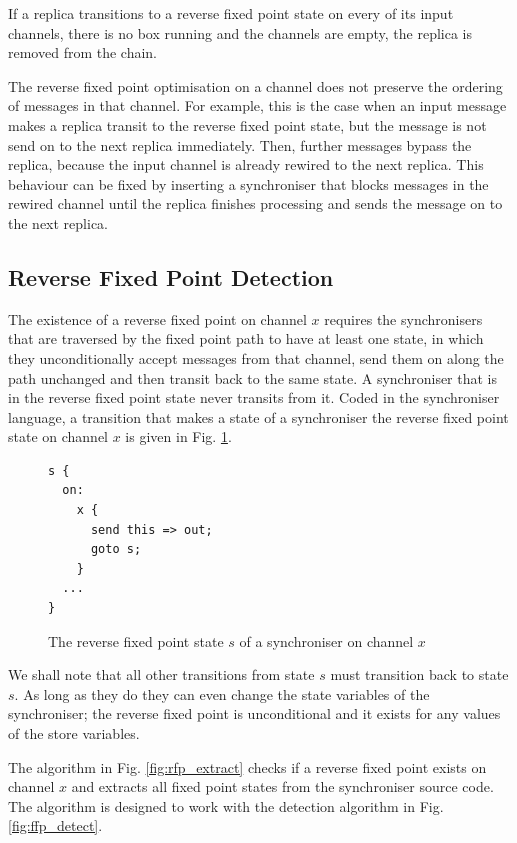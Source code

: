 If a replica transitions to a reverse fixed point state on every of its input channels, there is no box running and the channels are empty, the replica is removed from the chain.

The reverse fixed point optimisation on a channel does not preserve the ordering of messages in that channel. For example, this is the case when an input message makes a replica transit to the reverse fixed point state, but the message is not send on to the next replica immediately. Then, further messages bypass the replica, because the input channel is already rewired to the next replica. This behaviour can be fixed by inserting a synchroniser that blocks messages in the rewired channel until the replica finishes processing and sends the message on to the next replica.


    \subsection{Reverse Fixed Point Detection\label{rfp_detect}}
The existence of a reverse fixed point on channel $x$ requires the synchronisers that are traversed by the fixed point path to have at least one state, in which they unconditionally accept messages from that channel, send them on along the path unchanged and then transit back to the same state. A synchroniser that is in the reverse fixed point state never transits from it. Coded in the synchroniser language, a transition that makes a state of a synchroniser the reverse fixed point state on channel $x$ is given in Fig. \ref{fig:rfp_trans}.
\begin{figure}[h!]
\begin{lstlisting}[frame=single,mathescape]
s {
  on:
    x {
      send this => out;
      goto s;
    }
  ...
}
\end{lstlisting}
\caption{The reverse fixed point state $s$ of a synchroniser on channel $x$}
\label{fig:rfp_trans}
\end{figure}

We shall note that all other transitions from state $s$ must transition back to state $s$. As long as they do they can even change the state variables of the synchroniser; the reverse fixed point is unconditional and it exists for any values of the store variables.

The algorithm in Fig. \ref{fig:rfp_extract} checks if a reverse fixed point exists on channel $x$ and extracts all fixed point states from the synchroniser source code. The algorithm is designed to work with the detection algorithm in Fig. \ref{fig:ffp_detect}.

